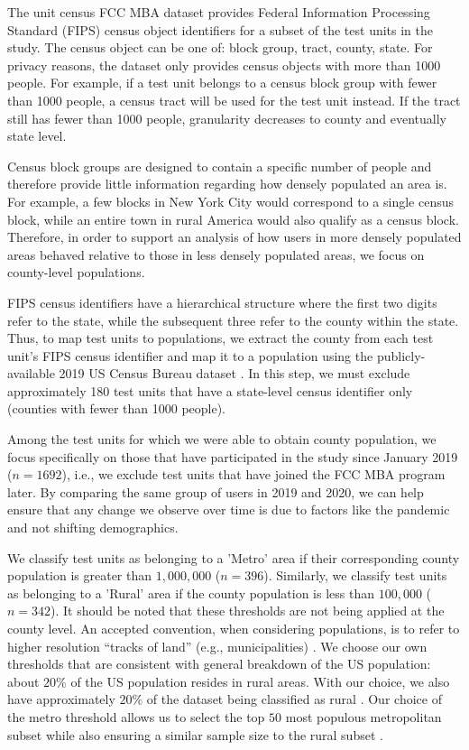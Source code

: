 \documentclass[conference,10pt]{IEEEtran}
\begin{document}
The unit census FCC MBA dataset provides Federal Information Processing Standard (FIPS) census object identifiers for a subset of the test units in the study. The census object can be one of: block group, tract, county, state. For privacy reasons, the dataset only provides census objects with more than 1000 people. For example, if a test unit belongs to a census block group with fewer than 1000 people, a census tract will be used for the test unit instead. If the tract still has fewer than 1000 people, granularity decreases to county and eventually state level.

Census block groups are designed to contain a specific number of people and therefore provide little information regarding how densely populated an area is. For example, a few blocks in New York City would correspond to a single census block, while an entire town in rural America would also qualify as a census block. Therefore, in order to support an analysis of how users in more densely populated areas behaved relative to those in less densely populated areas, we focus on county-level populations.

FIPS census identifiers have a hierarchical structure where the first two digits refer to the state, while the subsequent three refer to the county within the state. Thus, to map test units to populations, we extract the county from each test unit's FIPS census identifier and map it to a population using the publicly-available 2019 US Census Bureau dataset \cite{census}. In this step, we must exclude approximately 180 test units that have a state-level census identifier only (counties with fewer than 1000 people).

Among the test units for which we were able to obtain county population, we focus specifically on those that have participated in the study since January 2019 ($n=1692$), i.e., we exclude test units that have joined the FCC MBA program later. By comparing the same group of users in 2019 and 2020, we can help ensure that any change we observe over time is due to factors like the pandemic and not shifting demographics.

We classify test units as belonging to a 'Metro' area if their corresponding county population is greater than $1,000,000$ ($n=396$). Similarly, we classify test units as belonging to a 'Rural' area if the county population is less than $100,000$ ($n=342$). It should be noted that these thresholds are not being applied at the county level. An accepted convention, when considering populations, is to refer to higher resolution ``tracks of land'' (e.g., municipalities) \cite{censusMSA}. We choose our own thresholds that are consistent with general breakdown of the US population: about $20\%$ of the US population resides in rural areas. With our choice, we also have approximately $20\%$ of the dataset being classified as rural \cite{metroRural}. Our choice of the metro threshold allows us to select the top $50$ most populous metropolitan subset while also ensuring a similar sample size to the rural subset \cite{censusMSA}.
\end{document}
